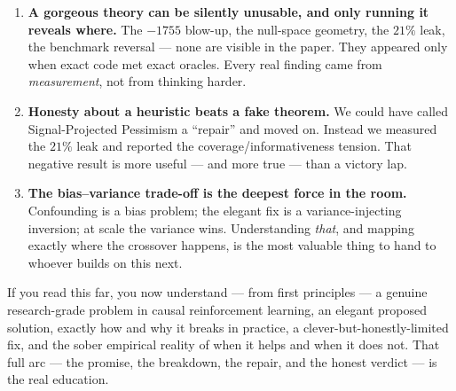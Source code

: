 \documentclass[11pt]{article}
\begin{document}
\begin{enumerate}
  \item \textbf{A gorgeous theory can be silently unusable, and only running it
  reveals where.} The $-1755$ blow-up, the null-space geometry, the $21\%$ leak, the
  benchmark reversal --- none are visible in the paper. They appeared only when exact
  code met exact oracles. Every real finding came from \emph{measurement}, not from
  thinking harder.
  \item \textbf{Honesty about a heuristic beats a fake theorem.} We could have called
  Signal-Projected Pessimism a ``repair'' and moved on. Instead we measured the $21\%$
  leak and reported the coverage/informativeness tension. That negative result is more
  useful --- and more true --- than a victory lap.
  \item \textbf{The bias--variance trade-off is the deepest force in the room.}
  Confounding is a bias problem; the elegant fix is a variance-injecting inversion; at
  scale the variance wins. Understanding \emph{that}, and mapping exactly where the
  crossover happens, is the most valuable thing to hand to whoever builds on this next.
\end{enumerate}

\noindent If you read this far, you now understand --- from first principles --- a
genuine research-grade problem in causal reinforcement learning, an elegant proposed
solution, exactly how and why it breaks in practice, a clever-but-honestly-limited
fix, and the sober empirical reality of when it helps and when it does not. That full
arc --- the promise, the breakdown, the repair, and the honest verdict --- is the
real education.
\end{document}
